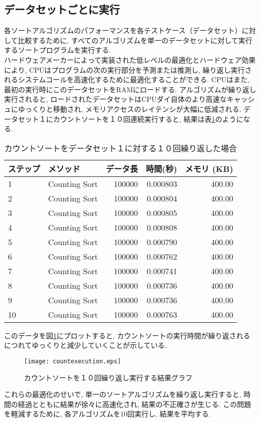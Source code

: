 \documentclass[a4j, 11pt]{jarticle}
\begin{document}
\subsection{データセットごとに実行}
各ソートアルゴリズムのパフォーマンスを各テストケース（データセット）に対して比較するために, すべてのアルゴリズムを単一のデータセットに対して実行するソートプログラムを実行する. \\
ハードウェアメーカーによって実装された低レベルの最適化とハードウェア効果により, CPUはプログラムの次の実行部分を予測または推測し, 繰り返し実行されるシステムコールを高速化するために最適化することができる\cite{mittal2018branch}. CPUはまた, 最初の実行時にこのデータセットをRAMにロードする. アルゴリズムが繰り返し実行されると, ロードされたデータセットはCPUダイ自体のより高速なキャッシュにゆっくりと移動され, メモリアクセスのレイテンシが大幅に低減される\cite{apple2023siliconcpuopt}. データセット１にカウントソートを１０回連続実行すると, 結果は表\ref{repeatedsortresult}のようになる. 
\begin{table}[H]
  \centering
  \caption{カウントソートをデータセット１に対する１０回繰り返した場合}\label{repeatedsortresult}
  \begin{tabular}{|l|l|r|r|r|}
    \hline
    \textbf{ステップ} & \textbf{メソッド} & \textbf{データ長} & \textbf{時間(秒)} & \textbf{メモリ (KB)} \\
    \hline
    1 & Counting Sort & 100000 & 0.000803 & 400.00 \\
    2 & Counting Sort & 100000 & 0.000804 & 400.00 \\
    3 & Counting Sort & 100000 & 0.000805 & 400.00 \\
    4 & Counting Sort & 100000 & 0.000808 & 400.00 \\
    5 & Counting Sort & 100000 & 0.000790 & 400.00 \\
    6 & Counting Sort & 100000 & 0.000762 & 400.00 \\
    7 & Counting Sort & 100000 & 0.000741 & 400.00 \\
    8 & Counting Sort & 100000 & 0.000736 & 400.00 \\
    9 & Counting Sort & 100000 & 0.000736 & 400.00 \\
    10 & Counting Sort & 100000 & 0.000763 & 400.00 \\
    \hline
  \end{tabular}
\end{table}
このデータを図\ref{repeatedsortgraph}にプロットすると, カウントソートの実行時間が繰り返されるにつれてゆっくりと減少していくことが示している. \\
\begin{figure}[H]
  \centering
  \texttt{[image: countexecution.eps]}
  \caption{カウントソートを１０回繰り返し実行する結果グラフ}\label{repeatedsortgraph}
\end{figure}
これらの最適化のせいで, 単一のソートアルゴリズムを繰り返し実行すると, 時間の経過とともに結果が徐々に高速化され, 結果の不正確さが生じる. この問題を軽減するために, 各アルゴリズムを10回実行し, 結果を平均する. \
\newpage
\end{document}
